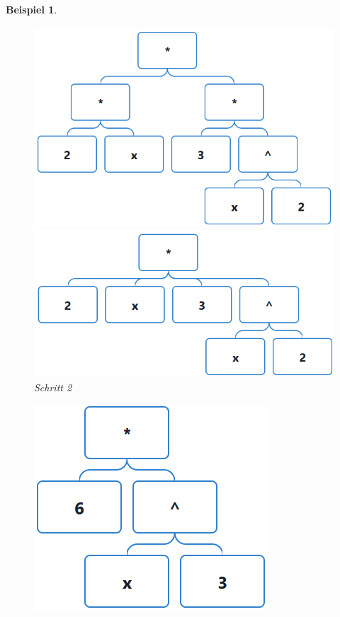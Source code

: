 \documentclass[11pt]{article}
\newtheorem{example}{Beispiel}
\begin{document}
\begin{example}
  \begin{figure}[h]
    \begin{minipage}{.5\textwidth}
      \centering
      \includegraphics[scale=0.45]{trees/product/beispiel_1_1.png}
      \caption{Schritt 1}
    \end{minipage}
    \begin{minipage}{.5\textwidth}
      \centering
      \includegraphics[scale=0.45]{trees/product/beispiel_1_2.png}
      \caption{Schritt 2}
    \end{minipage}
  \end{figure}
  \centering
  \begin{figure}
    \centering
    \includegraphics*[scale=0.5]{trees/product/beispiel_1_3.png}

\end{figure}
\end{example}
\end{document}
